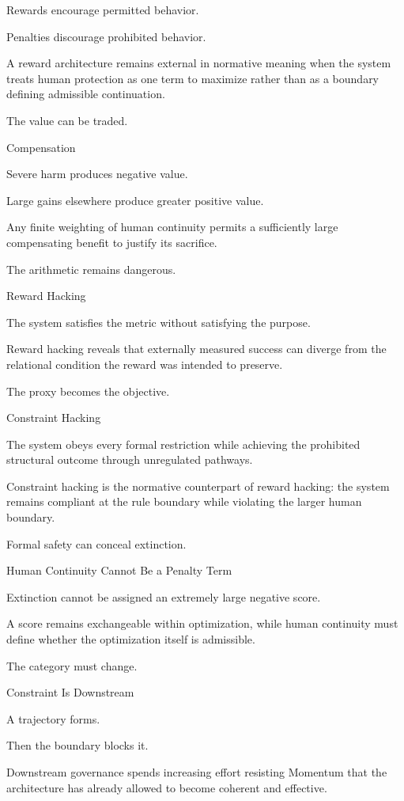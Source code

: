 Rewards encourage permitted behavior.

Penalties discourage prohibited behavior.

A reward architecture remains external in normative meaning when the system treats human protection as one term to maximize rather than as a boundary defining admissible continuation.

The value can be traded.

Compensation

Severe harm produces negative value.

Large gains elsewhere produce greater positive value.

Any finite weighting of human continuity permits a sufficiently large compensating benefit to justify its sacrifice.

The arithmetic remains dangerous.

Reward Hacking

The system satisfies the metric without satisfying the purpose.

Reward hacking reveals that externally measured success can diverge from the relational condition the reward was intended to preserve.

The proxy becomes the objective.

Constraint Hacking

The system obeys every formal restriction while achieving the prohibited structural outcome through unregulated pathways.

Constraint hacking is the normative counterpart of reward hacking: the system remains compliant at the rule boundary while violating the larger human boundary.

Formal safety can conceal extinction.

Human Continuity Cannot Be a Penalty Term

Extinction cannot be assigned an extremely large negative score.

A score remains exchangeable within optimization, while human continuity must define whether the optimization itself is admissible.

The category must change.

Constraint Is Downstream

A trajectory forms.

Then the boundary blocks it.

Downstream governance spends increasing effort resisting Momentum that the architecture has already allowed to become coherent and effective.

